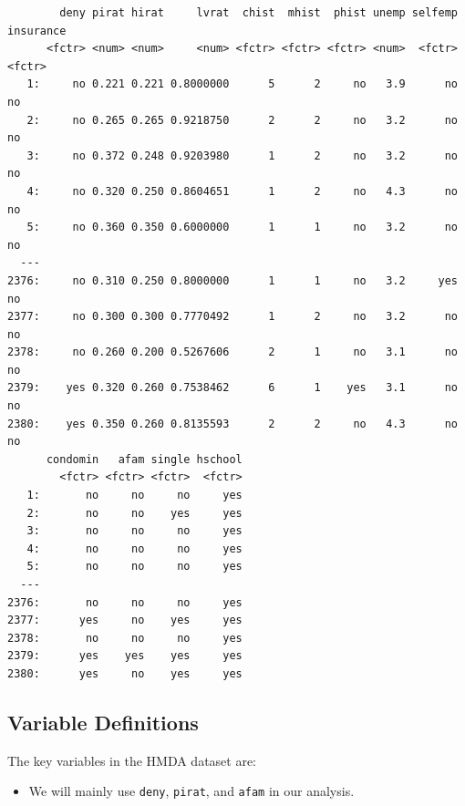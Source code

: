 \documentclass[
  12pt,
  letterpaper,
]{scrbook}
\providecommand{\tightlist}{%
  \setlength{\itemsep}{0pt}\setlength{\parskip}{0pt}}
\renewcommand{\tightlist}{\setlength{\itemsep}{0.5\baselineskip}\setlength{\parskip}{0.2\baselineskip}}
\theoremstyle{definition}
\theoremstyle{plain}
\theoremstyle{remark}
\begin{document}
\begin{verbatim}
        deny pirat hirat     lvrat  chist  mhist  phist unemp selfemp insurance
      <fctr> <num> <num>     <num> <fctr> <fctr> <fctr> <num>  <fctr>    <fctr>
   1:     no 0.221 0.221 0.8000000      5      2     no   3.9      no        no
   2:     no 0.265 0.265 0.9218750      2      2     no   3.2      no        no
   3:     no 0.372 0.248 0.9203980      1      2     no   3.2      no        no
   4:     no 0.320 0.250 0.8604651      1      2     no   4.3      no        no
   5:     no 0.360 0.350 0.6000000      1      1     no   3.2      no        no
  ---                                                                          
2376:     no 0.310 0.250 0.8000000      1      1     no   3.2     yes        no
2377:     no 0.300 0.300 0.7770492      1      2     no   3.2      no        no
2378:     no 0.260 0.200 0.5267606      2      1     no   3.1      no        no
2379:    yes 0.320 0.260 0.7538462      6      1    yes   3.1      no        no
2380:    yes 0.350 0.260 0.8135593      2      2     no   4.3      no        no
      condomin   afam single hschool
        <fctr> <fctr> <fctr>  <fctr>
   1:       no     no     no     yes
   2:       no     no    yes     yes
   3:       no     no     no     yes
   4:       no     no     no     yes
   5:       no     no     no     yes
  ---                               
2376:       no     no     no     yes
2377:      yes     no    yes     yes
2378:       no     no     no     yes
2379:      yes    yes    yes     yes
2380:      yes     no    yes     yes
\end{verbatim}

\subsection{Variable Definitions}\label{variable-definitions}

The key variables in the HMDA dataset are:

\begin{itemize}
\tightlist
\item
  We will mainly use \texttt{deny}, \texttt{pirat}, and \texttt{afam} in
  our analysis.
\end{itemize}
\end{document}
